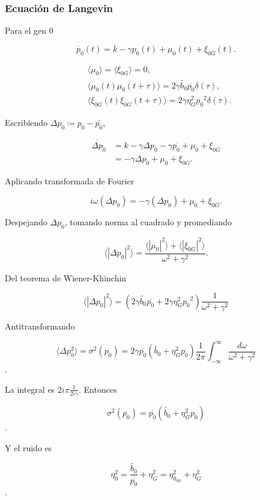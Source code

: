 \documentclass[10pt]{beamer}
\begin{document}
\begin{frame}
\frametitle{Ecuaci\'on de Langevin}

Para el gen $0$

\begin{equation*}
  \dot{p_0}(t) = k - \gamma p_0(t) + \mu_0(t) + \xi_{0G}(t).
\end{equation*}

\begin{align*}
  &\langle \mu_0 \rangle = \langle \xi_{0G} \rangle = 0,\\
  &\langle \mu_0(t)\mu_0(t+\tau) \rangle = 2 \gamma \tilde{b_0} \overline{p_0} \delta(\tau),\\
  &\langle \xi_{0G}(t)\xi_{0G}(t+\tau) \rangle = 2 \gamma \eta_G^2 \overline{p_0}^2 \delta(\tau).
\end{align*}

Escribiendo $\Delta p_0 \coloneqq p_0 - \bar{p_0}$,

\begin{align*}
   \dot{\Delta p_0} &= k - \gamma \Delta p_0 - \gamma \overline{p_0} + \mu _0 + \xi_{0G}\\
   & = -\gamma \Delta p_0 + \mu_0 + \xi_{0G}.
\end{align*}

\end{frame}
\begin{frame}
Aplicando transformada de Fourier

$$i\omega (\Delta p_0) = -\gamma (\Delta p_0) + \mu_0 + \xi_{0G}.$$

Despejando $\Delta p_0$, tomando norma al cuadrado y promediando

$$\langle \left| \Delta p_0 \right|^2 \rangle = \frac{\langle \left| \mu_0 \right|^2 \rangle + \langle \left| \xi_{0G} \right|^2 \rangle}{\omega^2+\gamma^2}.$$

Del teorema de Wiener-Khinchin

$$\langle \left| \Delta p_0 \right|^2 \rangle = \left( 2 \gamma \tilde{b_0} \overline{p_0} + 2 \gamma \eta_G^2 \overline{p_0}^2 \right) \frac{1}{\omega^2 + \gamma^2}$$

\end{frame}
\begin{frame}

Antitransformando

$$\langle \Delta p_0^2 \rangle = \sigma^2(p_0) = 2 \gamma \overline{p_0}\left(  \tilde{b_0} + \eta_G^2 \overline{p_0} \right) \frac{1}{2 \pi} \int ^{\infty}_{-\infty} \frac{d\omega}{\omega^2+\gamma^2}$$.

La integral es $2i\pi \frac{1}{2i\gamma}$. Entonces

$$\sigma^2(p_0) =  \overline{p_0} \left( \tilde{b_0} + \eta_G^2p_0 \right)$$.

Y el ruido es

$$\eta_0^2 = \frac{\tilde{b_0}}{\overline{p_0}} + \eta_G^2 = \eta_{0_{\text{int}}}^2 + \eta_G^2$$.

\end{frame}
\end{document}
